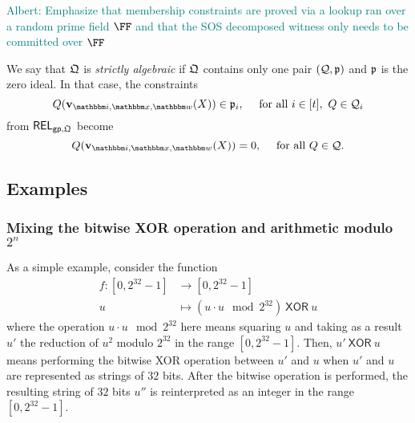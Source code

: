 \documentclass[11pt,letterpaper,usenames,dvipsnames]{article}
\newcommand{\albert}[1]{\textcolor{teal}{Albert: {#1}}}
\begin{document}
  \begin{remark}
      \albert{Emphasize that membership constraints are proved via a lookup ran over a random prime field $\FF$ and that the SOS decomposed witness only needs to be committed over $\FF$}
  \end{remark}

  \begin{definition}\label{d: strictly_algebraic} We say that  $\mathfrak{Q}$ is \emph{strictly algebraic} if $\mathfrak{Q}$ contains only one pair $(\mathcal{Q}, \mathfrak{p})$ and $\mathfrak{p}$ is the zero ideal.  In that case,  the constraints $$Q(\vv_{\idx, \inp,\wit}(X))\in \primeideal_i, \quad \text{ for all } i\in [t],\ Q\in \cQ_i$$ from $\mathsf{REL}_{\mathsf{gp},\mathfrak{Q}}$ become $$Q(\vv_{\idx, \inp,\wit}(X))=0, \quad  \text{ for all }Q\in \cQ.$$
  \end{definition}
  
\subsection{Examples}
\label{sec:example-sha}

\subsubsection{Mixing the bitwise XOR operation and arithmetic modulo $2^n$}

\newcommand{\and}{\ \mathsf{AND}\ }
\newcommand{\xor}{\ \mathsf{XOR}\ }
\newcommand{\eq}{\mathsf{eq}}

As a simple example, consider the function 
%
\begin{align*}
f: [0, 2^{32}-1] &\to [0, 2^{32}-1]\\
u &\mapsto (u\cdot u \mod 2^{32}) \xor u
\end{align*}
%
where the operation $u\cdot u \mod 2^{32}$ here means squaring $u$ and taking as a result $u'$ the reduction of $u^2$ modulo $2^{32}$ in the range $[0,2^{32}-1]$. Then,  $u'\xor u$ means performing the bitwise XOR operation between $u'$ and $u$ when $u'$ and $u$ are represented as strings of $32$ bits. After the bitwise operation is performed, the resulting string of $32$ bits $u''$ is reinterpreted as an integer in the range $[0, 2^{32}-1]$. 
\end{document}
